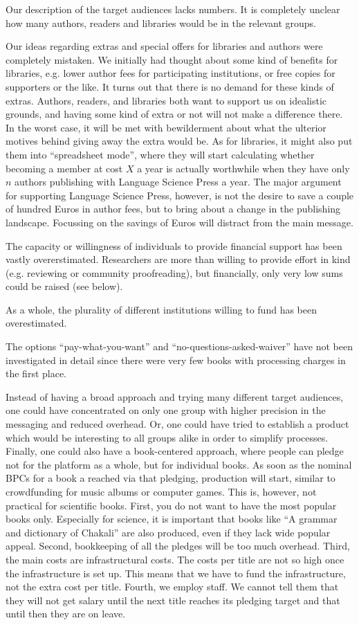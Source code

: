 \documentclass[output=guidelines,nonflat,smallfont,
draftmode
]{langsci/langscibook}
\newcommand{\evaluation}[1]{
  \renewcommand{\tblslinecolour}{lsLightOrange}
  \tblssy{receipt}{Evaluation}{\vspace*{-5mm}#1}
}
\newcommand{\othersolutions}[1]{
  \renewcommand{\tblslinecolour}{lsDarkGreenOne}
  \tblssy{more}{Other solutions}{\vspace*{-5mm}#1}
}
\renewcommand{\tblssy}[4][black!12]{%
  \renewcommand{\langscisymbol}{#2}\renewcommand{\tblsboxcolor}{#1}
  \begin{mdframed}[style=yellowexercise,frametitle={#3}]
    #4
  \end{mdframed}
}
\begin{document}
\evaluation{
Our description of the target audiences lacks numbers. It is completely unclear how many authors, readers and libraries would be in the relevant groups. 

Our ideas regarding extras and special offers for libraries and authors were completely mistaken. We initially had thought about some kind of benefits for libraries, e.g. lower author fees for participating institutions, or free copies for supporters or the like. It turns out that there is no demand for these kinds of extras. Authors, readers,  and libraries both want to support us on idealistic grounds, and having some kind of extra or not will not make a difference there. In the worst case, it will be met with bewilderment about what the ulterior motives behind giving away the extra would be. As for libraries, it might also put them into ``spreadsheet mode'', where they will start calculating whether becoming a member at cost $X$ a year is actually worthwhile when they have only $n$ authors publishing with Language Science Press a year. The major argument for supporting Language Science Press, however, is not the desire to save a couple of hundred Euros in author fees, but to bring about a change in the publishing landscape. Focussing on the savings of Euros will distract from the main message. 

The capacity or willingness of individuals to provide financial support has been vastly overerstimated. Researchers are more than willing to provide effort in kind (e.g. reviewing or community proofreading), but financially, only very low sums could be raised (see below). 

As a whole, the plurality of different institutions willing to fund has been overestimated. 

The options ``pay-what-you-want'' and ``no-questions-asked-waiver'' have not been investigated in detail since there were very few books with processing charges in the first place. 


}
\othersolutions{Instead of having a broad approach and trying many different target audiences, one could have concentrated on only one group with higher precision in the messaging and reduced overhead. Or, one could have tried to establish a product which would be interesting to all groups alike in order to simplify processes. Finally, one could also have a book-centered approach, where people can pledge not for the platform as a whole, but for individual books. As soon as the nominal BPCs for a book a reached via that pledging, production will start, similar to crowdfunding for music albums or computer games. This is, however, not practical for scientific books. First, you do not want to have the most popular books only. Especially for science, it is important that books like ``A grammar and dictionary of Chakali'' are also produced, even if they lack wide popular appeal. Second, bookkeeping of all the pledges will be too much overhead. Third, the main costs are infrastructural costs. The costs per title are not so high once the infrastructure is set up. This means that we have to fund the infrastructure, not the extra cost per title. Fourth, we employ staff. We cannot tell them that they will not get salary until the next title reaches its pledging target and that until then they are on leave.}
\end{document}
